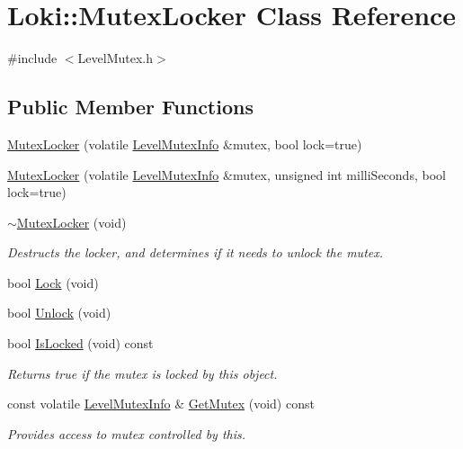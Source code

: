 \hypertarget{classLoki_1_1MutexLocker}{}\section{Loki\+:\+:Mutex\+Locker Class Reference}
\label{classLoki_1_1MutexLocker}


{\ttfamily \#include $<$Level\+Mutex.\+h$>$}

\subsection*{Public Member Functions}
\begin{DoxyCompactItemize}
\item 
\hyperlink{classLoki_1_1MutexLocker_aae8699ba4423d83aff277149c9008ec8}{Mutex\+Locker} (volatile \hyperlink{classLoki_1_1LevelMutexInfo}{Level\+Mutex\+Info} \&mutex, bool lock=true)
\item 
\hyperlink{classLoki_1_1MutexLocker_aaeffc60518694479ac9985ee1878ed0f}{Mutex\+Locker} (volatile \hyperlink{classLoki_1_1LevelMutexInfo}{Level\+Mutex\+Info} \&mutex, unsigned int milli\+Seconds, bool lock=true)
\item 
\hypertarget{classLoki_1_1MutexLocker_abab99d9acf93e5add22deb8cf7d04a09}{}\hyperlink{classLoki_1_1MutexLocker_abab99d9acf93e5add22deb8cf7d04a09}{$\sim$\+Mutex\+Locker} (void)\label{classLoki_1_1MutexLocker_abab99d9acf93e5add22deb8cf7d04a09}

\begin{DoxyCompactList}\small\item\em Destructs the locker, and determines if it needs to unlock the mutex. \end{DoxyCompactList}\item 
bool \hyperlink{classLoki_1_1MutexLocker_ac929c01961dc1b2a2ee1a39333a79c0b}{Lock} (void)
\item 
bool \hyperlink{classLoki_1_1MutexLocker_af5ea31fe3fac046cf646722cc8befa09}{Unlock} (void)
\item 
\hypertarget{classLoki_1_1MutexLocker_a231de9c6db22151209ab2537fc45c65e}{}bool \hyperlink{classLoki_1_1MutexLocker_a231de9c6db22151209ab2537fc45c65e}{Is\+Locked} (void) const \label{classLoki_1_1MutexLocker_a231de9c6db22151209ab2537fc45c65e}

\begin{DoxyCompactList}\small\item\em Returns true if the mutex is locked by this object. \end{DoxyCompactList}\item 
\hypertarget{classLoki_1_1MutexLocker_a2b49f0c689ff6cb8e29f2d8963b041df}{}const volatile \hyperlink{classLoki_1_1LevelMutexInfo}{Level\+Mutex\+Info} \& \hyperlink{classLoki_1_1MutexLocker_a2b49f0c689ff6cb8e29f2d8963b041df}{Get\+Mutex} (void) const \label{classLoki_1_1MutexLocker_a2b49f0c689ff6cb8e29f2d8963b041df}

\begin{DoxyCompactList}\small\item\em Provides access to mutex controlled by this. \end{DoxyCompactList}\end{DoxyCompactItemize}


